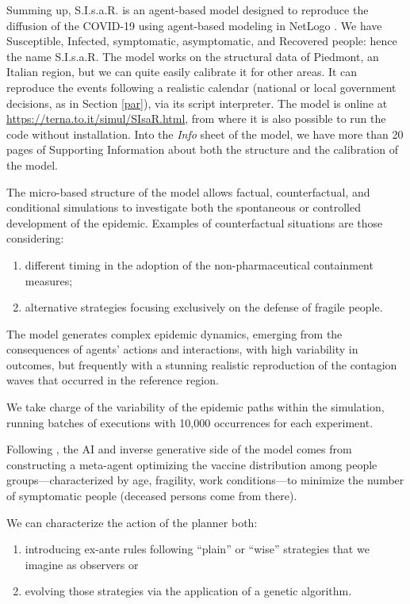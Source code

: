 \documentclass[graybox]{svmult}
\begin{document}
Summing up, S.I.s.a.R. \cite{SIsaR} is an agent-based model designed to reproduce the diffusion of the COVID-19 using agent-based modeling in NetLogo \cite{NetLogo}. We have Susceptible, Infected, symptomatic, asymptomatic, and Recovered people: hence the name S.I.s.a.R. The model works on the structural data of Piedmont, an Italian region, but we can quite easily calibrate it for other areas. It can reproduce the events following a realistic calendar (national or local government decisions, as in Section \ref{par}), via its script interpreter. The model is online at \href{https://terna.to.it/simul/SIsaR.html}{https://terna.to.it/simul/SIsaR.html}, from where it is also possible to run the code without installation. Into the \emph{Info} sheet of the model, we have more than 20 pages of Supporting Information about both the structure and the calibration of the model.


The micro-based structure of the model allows factual, counterfactual, and conditional simulations to investigate both the spontaneous or controlled development of the epidemic. Examples of counterfactual situations are those considering:

\begin{enumerate}[label=\roman*]
\item different timing in the adoption of the non-pharmaceutical containment measures;
\item alternative strategies focusing exclusively on the defense of fragile people.
\end{enumerate}

The model generates complex epidemic dynamics, emerging from the consequences of agents' actions and interactions, with high variability in outcomes, but frequently with a stunning realistic reproduction of the contagion waves that occurred in the reference region. 

We take charge of the variability of the epidemic paths within the simulation, running batches of executions with 10,000 occurrences for each experiment.

Following \cite{inverseGen}, the AI and inverse generative side of the model comes from constructing a meta-agent optimizing the vaccine distribution among people groups---characterized by age, fragility, work conditions---to minimize the number of symptomatic people (deceased persons come from there).

We can characterize the action of the planner both:
\begin{enumerate}[label=\roman*]
\item introducing ex-ante rules following ``plain'' or ``wise'' strategies that we imagine as observers or
\item evolving those strategies via the application of a genetic algorithm. 
\end{enumerate}
\end{document}
